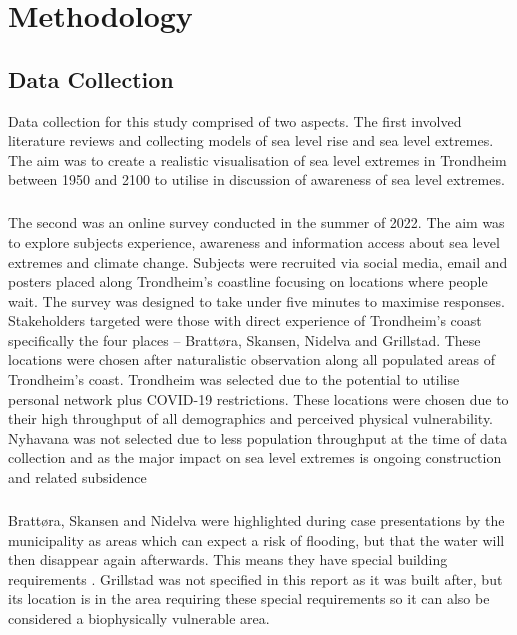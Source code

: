 


\chapter{Methodology}
\section{Data Collection}

Data collection for this study comprised of two aspects.  The first involved literature reviews and collecting models of sea level rise and sea level extremes. The aim was to create a realistic visualisation of sea level extremes in Trondheim between 1950 and 2100 to utilise in discussion of awareness of sea level extremes. 
    \paragraph{}
The second was an online survey conducted in the summer of 2022. The aim was to explore subjects experience, awareness and information access about sea level extremes and climate change. Subjects were recruited via social media, email and posters placed along Trondheim’s coastline focusing on locations where people wait. The survey was designed to take under five minutes to maximise responses. Stakeholders targeted were those with direct experience of Trondheim’s coast specifically the four places – Brattøra, Skansen, Nidelva and Grillstad. These locations were chosen after naturalistic observation along all populated areas of Trondheim’s coast. Trondheim was selected due to the potential to utilise personal network plus COVID-19 restrictions. These locations were chosen due to their high throughput of all demographics and perceived physical vulnerability. Nyhavana was not selected due to less population throughput at the time of data collection and as the major impact on sea level extremes is ongoing construction and related subsidence \cite{miljoenheten_og_byplankontoret_trondheim_kommune_9-notat-om-havnivastigning-og-stormflo---hensyn-i-arealplanlegging-nyhavnapdf_2020}


\paragraph{}
Brattøra, Skansen and Nidelva were highlighted during case presentations by the municipality as areas which can expect a risk of flooding, but that the water will then disappear again afterwards. This means they have special building requirements \cite{hanssen_saksframlegg_2013}. Grillstad was not specified in this report as it was built after, but its location is in the area requiring these special requirements so it can also be considered a biophysically vulnerable area.  

